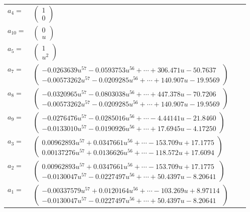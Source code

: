\documentclass[1p]{elsarticle_modified}
\theoremstyle{definition}
\begin{document}
\begin{tabular}{m{7pt} m{180pt} m{7pt} m{180pt} }
\flushright $a_{4}=$&$\begin{pmatrix}1\\0\end{pmatrix}$ \\
\flushright $a_{10}=$&$\begin{pmatrix}0\\u\end{pmatrix}$ \\
\flushright $a_{5}=$&$\begin{pmatrix}1\\u^2\end{pmatrix}$ \\
\flushright $a_{7}=$&$\begin{pmatrix}-0.0263639 u^{57}-0.0593753 u^{56}+\cdots+306.471 u-50.7637\\-0.00573262 u^{57}-0.0209285 u^{56}+\cdots+140.907 u-19.9569\end{pmatrix}$ \\
\flushright $a_{8}=$&$\begin{pmatrix}-0.0320965 u^{57}-0.0803038 u^{56}+\cdots+447.378 u-70.7206\\-0.00573262 u^{57}-0.0209285 u^{56}+\cdots+140.907 u-19.9569\end{pmatrix}$ \\
\flushright $a_{9}=$&$\begin{pmatrix}-0.0276476 u^{57}-0.0285016 u^{56}+\cdots-4.44141 u-21.8460\\-0.0133010 u^{57}-0.0190926 u^{56}+\cdots+17.6945 u-4.17250\end{pmatrix}$ \\
\flushright $a_{3}=$&$\begin{pmatrix}0.00962893 u^{57}+0.0347661 u^{56}+\cdots-153.709 u+17.1775\\0.00137276 u^{57}+0.0136626 u^{56}+\cdots-118.572 u+17.6094\end{pmatrix}$ \\
\flushright $a_{2}=$&$\begin{pmatrix}0.00962893 u^{57}+0.0347661 u^{56}+\cdots-153.709 u+17.1775\\-0.0130047 u^{57}-0.0227497 u^{56}+\cdots+50.4397 u-8.20641\end{pmatrix}$ \\
\flushright $a_{1}=$&$\begin{pmatrix}-0.00337579 u^{57}+0.0120164 u^{56}+\cdots-103.269 u+8.97114\\-0.0130047 u^{57}-0.0227497 u^{56}+\cdots+50.4397 u-8.20641\end{pmatrix}$ \\

\end{tabular}
\end{document}
